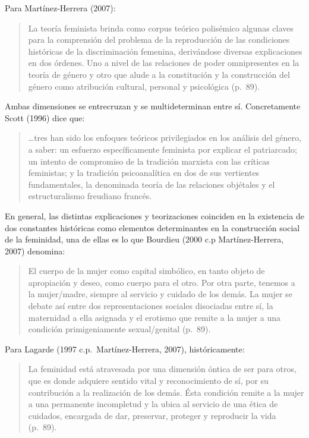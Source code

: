 Para Martínez-Herrera (2007):

\begin{quote}
    La teoría feminista brinda como corpus teórico polisémico algunas claves para
    la comprensión del problema de la reproducción de las condiciones históricas de
    la discriminación femenina, derivándose diversas explicaciones en dos órdenes.
    Uno a nivel de las relaciones de poder omnipresentes en la teoría de género y
    otro que alude a la constitución y la construcción del género como atribución
    cultural, personal y psicológica (p.~89).
\end{quote}

Ambas dimensiones se entrecruzan y se multideterminan entre sí.
Concretamente Scott (1996) dice que:

\begin{quote}
    …tres han sido los enfoques teóricos privilegiados en los análisis del
    género, a saber: un esfuerzo específicamente feminista por explicar el
    patriarcado;
    un intento de compromiso de la tradición marxista con las críticas feministas;
    y la tradición psicoanalítica en dos de sus vertientes fundamentales, la
    denominada teoría de las relaciones objétales y el estructuralismo freudiano
    francés.
\end{quote}

En general, las distintas explicaciones y teorizaciones coinciden en la
existencia de dos constantes históricas como elementos determinantes en la
construcción social de la feminidad, una de ellas es lo que Bourdieu (2000 c.p
Martínez-Herrera, 2007) denomina:

\begin{quote}
    El cuerpo de la mujer como capital simbólico, en tanto objeto de apropiación
    y deseo, como cuerpo para el otro.
    Por otra parte, tenemos a la mujer/madre, siempre al servicio y cuidado de los
    demás.
    La mujer se debate así entre dos representaciones sociales disociadas entre sí,
    la maternidad a ella asignada y el erotismo que remite a la mujer a una
    condición primigeniamente sexual/genital (p.~89).
\end{quote}

Para Lagarde (1997 c.p.~Martínez-Herrera, 2007), históricamente:

\begin{quote}
    La feminidad está atravesada por una dimensión óntica de ser para otros, que es
    donde adquiere sentido vital y reconocimiento de sí, por su contribución a la
    realización de los demás.
    Ésta condición remite a la mujer a una permanente incompletud y la
    ubica al servicio de una ética de cuidados, encargada de dar,
    preservar, proteger y reproducir la vida (p.~89).
\end{quote}

